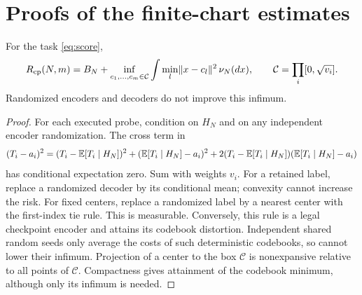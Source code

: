 \section{Proofs of the finite-chart estimates}\label{sec:proofs}\label{sec:proof}
\begin{lemma}\label{lem:projection}
For the task \eqref{eq:score},
\begin{equation}\label{eq:projection}
 R_{\mathrm{cp}}(N,m)=B_N+
 \inf_{c_1,\ldots,c_m\in\mathcal C}\int\min_l\lVert x-c_l\rVert^2\,\nu_N(dx),
 \qquad \mathcal C=\prod_i[0,\sqrt{v_i}].
\end{equation}
Randomized encoders and decoders do not improve this infimum.
\end{lemma}
\begin{proof}
For each executed probe, condition on $H_N$ and on any independent encoder randomization. The cross term in
\[
 (T_i-a_i)^2=(T_i-\mathbb E[T_i\mid H_N])^2+
 (\mathbb E[T_i\mid H_N]-a_i)^2+
 2(T_i-\mathbb E[T_i\mid H_N])(\mathbb E[T_i\mid H_N]-a_i)
\]
has conditional expectation zero. Sum with weights $v_i$. For a retained label, replace a randomized decoder by its conditional mean; convexity cannot increase the risk. For fixed centers, replace a randomized label by a nearest center with the first-index tie rule. This is measurable. Conversely, this rule is a legal checkpoint encoder and attains its codebook distortion. Independent shared random seeds only average the costs of such deterministic codebooks, so cannot lower their infimum. Projection of a center to the box $\mathcal C$ is nonexpansive relative to all points of $\mathcal C$. Compactness gives attainment of the codebook minimum, although only its infimum is needed.
\end{proof}

